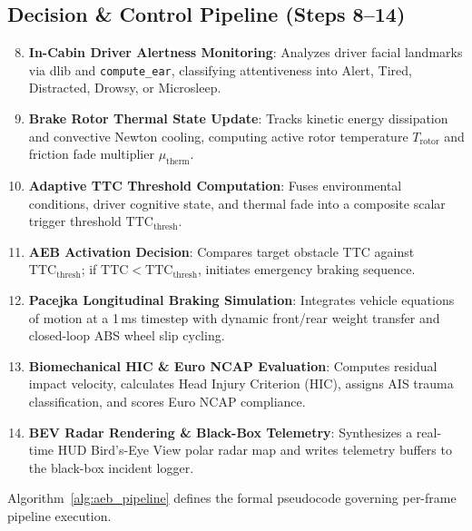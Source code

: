 \documentclass[3p,twocolumn]{elsarticle}
\begin{document}
\subsection{Decision \& Control Pipeline (Steps 8--14)}
\begin{enumerate}
  \setcounter{enumi}{7}
  \item \textbf{In-Cabin Driver Alertness Monitoring}: Analyzes driver facial landmarks via dlib and \texttt{compute\_ear}, classifying attentiveness into Alert, Tired, Distracted, Drowsy, or Microsleep.
  \item \textbf{Brake Rotor Thermal State Update}: Tracks kinetic energy dissipation and convective Newton cooling, computing active rotor temperature $T_{\text{rotor}}$ and friction fade multiplier $\mu_{\text{therm}}$.
  \item \textbf{Adaptive TTC Threshold Computation}: Fuses environmental conditions, driver cognitive state, and thermal fade into a composite scalar trigger threshold $\text{TTC}_{\text{thresh}}$.
  \item \textbf{AEB Activation Decision}: Compares target obstacle TTC against $\text{TTC}_{\text{thresh}}$; if $\text{TTC} < \text{TTC}_{\text{thresh}}$, initiates emergency braking sequence.
  \item \textbf{Pacejka Longitudinal Braking Simulation}: Integrates vehicle equations of motion at a 1\,ms timestep with dynamic front/rear weight transfer and closed-loop ABS wheel slip cycling.
  \item \textbf{Biomechanical HIC \& Euro NCAP Evaluation}: Computes residual impact velocity, calculates Head Injury Criterion (HIC), assigns AIS trauma classification, and scores Euro NCAP compliance.
  \item \textbf{BEV Radar Rendering \& Black-Box Telemetry}: Synthesizes a real-time HUD Bird's-Eye View polar radar map and writes telemetry buffers to the black-box incident logger.
\end{enumerate}

Algorithm~\ref{alg:aeb_pipeline} defines the formal pseudocode governing per-frame pipeline execution.
\end{document}
